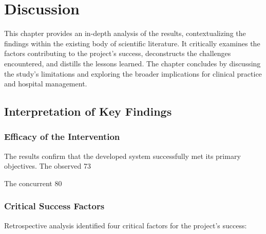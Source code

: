 \chapter{Discussion}

This chapter provides an in-depth analysis of the results, contextualizing the findings within the existing body of scientific literature. It critically examines the factors contributing to the project's success, deconstructs the challenges encountered, and distills the lessons learned. The chapter concludes by discussing the study's limitations and exploring the broader implications for clinical practice and hospital management.

\section{Interpretation of Key Findings}

\subsection{Efficacy of the Intervention}

The results confirm that the developed system successfully met its primary objectives. The observed 73%

The concurrent 80%

\subsection{Critical Success Factors}

Retrospective analysis identified four critical factors for the project's success:

